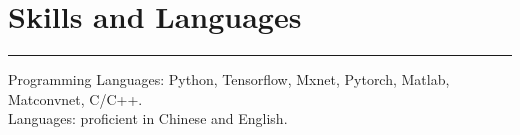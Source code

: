 \documentclass[10pt,letterpaper]{article}
\begin{document}
\section*{Skills and Languages} \vspace{-8pt}
\hrule \vspace{10pt}
{Programming Languages:} Python, Tensorflow, Mxnet, Pytorch, Matlab, Matconvnet, C/C++.\\
{Languages:} proficient in Chinese and English.


\end{document}

